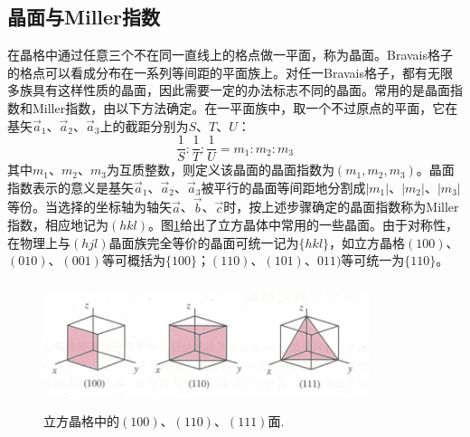 \subsection{晶面与Miller指数}\label{sub:Crystal_Plane} 
在晶格中通过任意三个不在同一直线上的格点做一平面，称为晶面。Bravais格子的格点可以看成分布在一系列等间距的平面族上。对任一Bravais格子，都有无限多族具有这样性质的晶面，因此需要一定的办法标志不同的晶面。常用的是晶面指数和Miller指数，由以下方法确定。在一平面族中，取一个不过原点的平面，它在基矢$\vec a_1$、$\vec a_2$、$\vec a_3$上的截距分别为$S$、$T$、$U$：
\begin{equation}
	\frac1S:\frac1T:\frac1U=m_1:m_2:m_3
	\label{eq:SSI-10}
\end{equation} 
其中$m_1$、$m_2$、$m_3$为互质整数，则定义该晶面的晶面指数为$(m_1,m_2,m_3)$。晶面指数表示的意义是基矢$\vec a_1$、$\vec a_2$、$\vec a_3$被平行的晶面等间距地分割成$|m_1|$、$|m_2|$、$|m_3|$等份。当选择的坐标轴为轴矢$\vec a$、$\vec b$、$\vec c$时，按上述步骤确定的晶面指数称为Miller指数，相应地记为$(hkl)$。图\ref{Fig:Cubic_plane}给出了立方晶体中常用的一些晶面。由于对称性，在物理上与$(hjl)$晶面族完全等价的晶面可统一记为$\{hkl\}$，如立方晶格$(100)$、$(010)$、$(001)$等可概括为$\{100\}$；$(110)$、$(101)$、$011)$等可统一为$\{110\}$。
\begin{figure}[h!]
\centering
\vspace*{-0.05in}
\includegraphics[height=1.45in,width=3.75in,viewport=0 0 92 33,clip]{Figures/Cubic_Plane.png}
\caption{\small \textrm{立方晶格中的$(100)$、$(110)$、$(111)$面.}}%
\label{Fig:Cubic_plane}
\end{figure}

